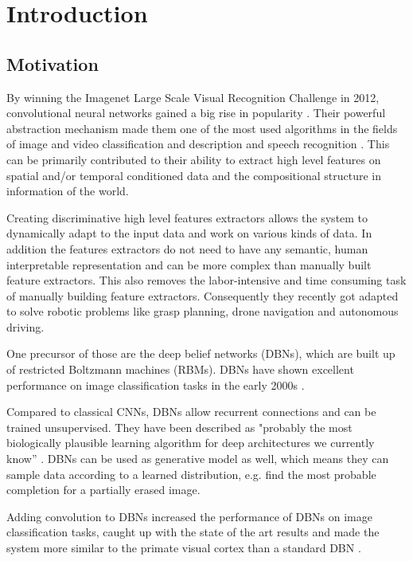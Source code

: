 \chapter{Introduction}

\section{Motivation}

By winning the Imagenet Large Scale Visual Recognition Challenge in 2012, convolutional neural networks gained a big rise in popularity \cite{NIPS2012_4824}. 
Their powerful abstraction mechanism made them one of the most used algorithms in the fields of image and video classification and description and speech recognition \cite{szegedy2015going}\cite{karpathy2014large}\cite{abdel2014convolutional}\cite{LeCun2015}. 
This can be primarily contributed to their ability to extract high level features on spatial and/or temporal conditioned data and the compositional structure in information of the world.

Creating discriminative high level features extractors allows the system to dynamically adapt to the input data and work on various kinds of data. 
In addition the features extractors do not need to have any semantic, human interpretable representation and can be more complex than manually built feature extractors. 
This also removes the labor-intensive and time consuming task of manually building feature extractors.
Consequently they recently got adapted to solve robotic problems like grasp planning, drone navigation and autonomous driving\cite{giusti2016machine}\cite{levine2016learning}\cite{chen2015deepdriving}. 

One precursor of those are the deep belief networks (DBNs), which are built up of restricted Boltzmann machines (RBMs). 
DBNs have shown excellent performance on image classification tasks in the early 2000s \cite{hinton2006fast}\cite{lee2009convolutional}.

Compared to classical CNNs, DBNs allow recurrent connections and can be trained unsupervised. 
They have been described as  "probably the most biologically plausible learning algorithm for deep architectures we currently know” \cite{bengio2015towards}. 
DBNs can be used as generative model as well, which means they can sample data according to a learned distribution, e.g. find the most probable completion for a partially erased image.

Adding convolution to DBNs increased the performance of DBNs on image classification tasks, caught up with the state of the art results and made the system more similar to the primate visual cortex than a standard DBN \cite{lee2009convolutional}. 

